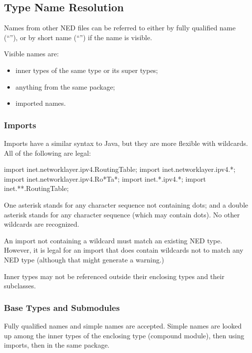 {\subsection{Type Name Resolution}
\label{sec:ned-ref:type-name-resolution}

Names from other NED files can be referred to either by fully qualified
name (``''), or by short name
(``'') if the name is visible.

Visible names are:

\begin{itemize}
  \item inner types of the same type or its super types;
  \item anything from the same package;
  \item imported names.
\end{itemize}

\subsubsection{Imports}
\label{sec:ned-ref:imports}

Imports have a similar syntax to Java, but they are more flexible with wildcards.
All of the following are legal:

\begin{ned}
import inet.networklayer.ipv4.RoutingTable;
import inet.networklayer.ipv4.*;
import inet.networklayer.ipv4.Ro*Ta*;
import inet.*.ipv4.*;
import inet.**.RoutingTable;
\end{ned}

One asterisk stands for any character sequence not containing dots; and a
double asterisk stands for any character sequence (which may contain dots).
No other wildcards are recognized.

An import not containing a wildcard must match an existing NED type.
However, it is legal for an import that does contain wildcards
not to match any NED type (although that might generate a warning.)

Inner types may not be referenced outside their enclosing types and
their subclasses.

\subsubsection{Base Types and Submodules}
\label{sec:ned-ref:base-types-and-submodules}

Fully qualified names and simple names are accepted. Simple names
are looked up among the inner types of the enclosing type (compound
module), then using imports, then in the same package.

}
